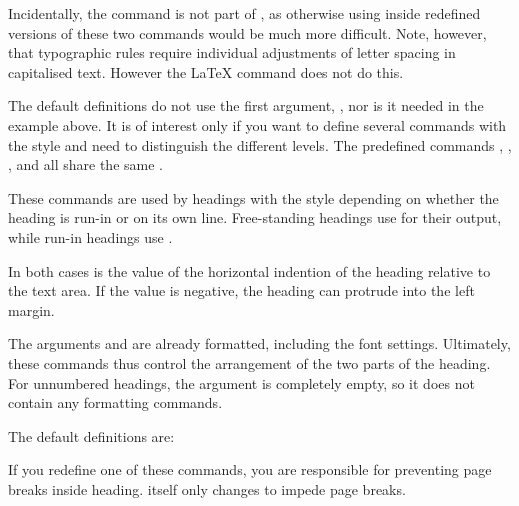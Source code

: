 Incidentally, the  command is not part of
, as otherwise using  inside redefined
versions of these two commands would be much more difficult. Note, however,
that typographic rules require individual adjustments of letter spacing in
capitalised text. However the \LaTeX{}  command does not
do this.

The default definitions do not use the first argument, , nor is
it needed in the example above. It is of interest only if you want to define
several commands with the  style and need to distinguish the
different levels. The predefined commands ,
, , and
 all share the same 
.%
\EndIndexGroup


\begin{Declaration}
\end{Declaration}
These commands are used by headings with the 
style depending on whether the heading is run-in or on its own line.
Free-standing headings use  for their output, while
run-in headings use .

In both cases  is the value of the horizontal indention of the
heading relative to the text area. If the value is negative, the heading can
protrude into the left margin.

The arguments  and  are already formatted, including
the font settings. Ultimately, these commands thus control the arrangement of
the two parts of the heading. For unnumbered headings, the 
argument is completely empty, so it does not contain any formatting commands.

The default definitions are:
\begin{lstcode}
\newcommand{\sectionlinesformat}[4]{%
  \@hangfrom{\hskip #2#3}{#4}%
}
\newcommand{\sectioncatchphraseformat}[4]{%
  \hskip #2#3#4%
}
\end{lstcode}

If you redefine one of these commands, you are responsible for preventing page
breaks inside heading. \KOMAScript{} itself only changes
 to impede page breaks.

